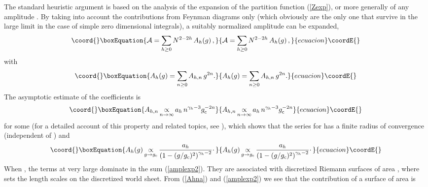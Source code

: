 \documentclass[a4paper,12pt]{article}
\begin{document}
{The standard heuristic argument is based on the analysis of the 
\coordHE{} expansion of the partition function (\ref{Zexp}), or more 
generally of any amplitude \coordHE{}. By taking into account
the contributions from Feynman diagrams only (which obviously are the only 
one that survive in the large \coordHE{} limit in the case of simple zero
dimensional integrals), a suitably normalized amplitude can be expanded,
%
\begin{equation}\coord{}\boxEquation{
\label{amplexp}
{\cal A} = \sum_{h\geq 0} N^{2-2h}\, A_{h}(g)\, ,
}{
{\cal A} = \sum_{h\geq 0} N^{2-2h}\, A_{h}(g)\, ,
}{ecuacion}\coordE{}\end{equation}
%
with
%
\begin{equation}\coord{}\boxEquation{
\label{amplexp2}
A_{h}(g) = \sum_{n\geq 0}A_{h,n}\, g^{2n}.
}{
A_{h}(g) = \sum_{n\geq 0}A_{h,n}\, g^{2n}.
}{ecuacion}\coordE{}\end{equation}
%
The asymptotic estimate of the coefficients \coordHE{} is 
%
\begin{equation}\coord{}\boxEquation{
\label{Ahna}
A_{h,n} \mathop{\propto}\limits _{n\rightarrow\infty} a_{h}\, 
n^{\gamma_{h}-3} g_{\rm c}^{-2n}
}{
A_{h,n} \mathop{\propto}\limits _{n\rightarrow\infty} a_{h}\, 
n^{\gamma_{h}-3} g_{\rm c}^{-2n}
}{ecuacion}\coordE{}\end{equation}
%
for some \coordHE{} (for a detailed account of this property and related topics,
see \cite{bes}),
which shows that the series for \coordHE{} has a finite radius of 
convergence \myHighlight{$\gc$}\coordHE{} (independent of \coordHE{}) and
%
\begin{equation}\coord{}\boxEquation{
\label{Ahlim}
A_{h}(g) \mathop{\propto}\limits _{g\rightarrow\gc} {a_h\over 
\left(1-(g/\gc)^2\right)^{\gamma_{h}-2}}\cdotp
}{
A_{h}(g) \mathop{\propto}\limits _{g\rightarrow\gc} {a_h\over 
\left(1-(g/\gc)^2\right)^{\gamma_{h}-2}}\cdotp
}{ecuacion}\coordE{}\end{equation}
%
When \coordHE{}, the terms at very large \coordHE{} dominate in the 
sum (\ref{amplexp2}). They are associated with discretized Riemann surfaces of 
area \coordHE{}, where \coordHE{} sets the length scales on the discretized 
world sheet. From (\ref{Ahna}) and (\ref{amplexp2}) 
we see that the contribution of a surface of area \coordHE{} is 
}
\end{document}
